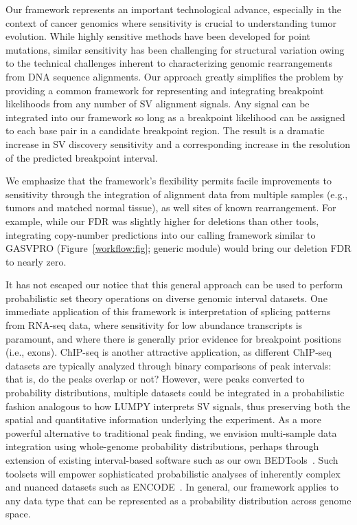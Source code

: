 \documentclass[10pt]{bmc_article}
\newenvironment{bmcformat}{\begin{raggedright}\baselineskip20pt\sloppy\setboolean{publ}{false}}{\end{raggedright}\baselineskip20pt\sloppy}
\begin{document}
\begin{bmcformat}
Our framework represents an important technological advance, especially in the
context of cancer genomics where sensitivity is crucial to understanding tumor
evolution. While highly sensitive methods have been developed for point
mutations, similar sensitivity has been challenging for structural variation
owing to the technical challenges inherent to characterizing genomic
rearrangements from DNA sequence alignments. Our approach greatly simplifies the
problem by providing a common framework for representing and integrating
breakpoint likelihoods from any number of SV alignment signals. Any signal can
be integrated into our framework so long as a breakpoint likelihood can be
assigned to each base pair in a candidate breakpoint region. The result is a
dramatic increase in SV discovery sensitivity and a corresponding increase in
the resolution of the predicted breakpoint interval.

We emphasize that the framework's flexibility permits facile improvements to
sensitivity through the integration of alignment data from multiple samples
(e.g., tumors and matched normal tissue), as well sites of known rearrangement.
For example, while our FDR was slightly higher for deletions than other tools,
integrating copy-number predictions into our calling framework similar to
GASVPRO (Figure~\ref{workflow:fig}; generic module) would bring our deletion FDR to nearly zero.

It has not escaped our notice that this general approach can be used to perform
probabilistic set theory operations on diverse genomic interval datasets. One
immediate application of this framework is interpretation of splicing patterns
from RNA-seq data, where sensitivity for low abundance transcripts is paramount,
and where there is generally prior evidence for breakpoint positions (i.e.,
exons). ChIP-seq is another attractive application, as different ChIP-seq
datasets are typically analyzed through binary comparisons of peak intervals:
that is, do the peaks overlap or not? However, were peaks converted to
probability distributions, multiple datasets could be integrated in a
probabilistic fashion analogous to how LUMPY interprets SV signals, thus
preserving both the spatial and quantitative information underlying the
experiment. As a more powerful alternative to traditional peak finding, we
envision multi-sample data integration using whole-genome probability
distributions, perhaps through extension of existing interval-based software
such as our own BEDTools~\cite{quinlan2010a}. Such toolsets will empower
sophisticated probabilistic analyses of inherently complex and nuanced datasets
such as ENCODE~\cite{encode2012}. In general, our framework applies to any data
type that can be represented as a probability distribution across genome space.



\end{bmcformat}
\end{document}
